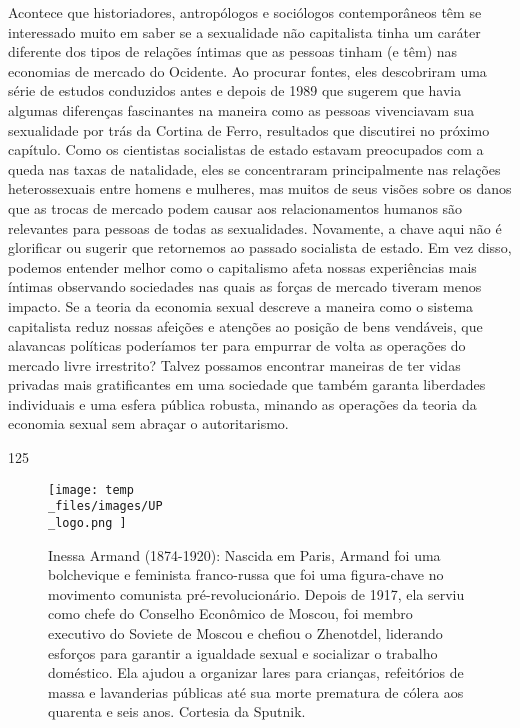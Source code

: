 Acontece que historiadores, antropólogos e sociólogos contemporâneos têm se interessado muito em saber se a sexualidade não capitalista tinha um caráter diferente dos tipos de relações íntimas que as pessoas tinham (e têm) nas economias de mercado do Ocidente. Ao procurar fontes, eles descobriram uma série de estudos conduzidos antes e depois de 1989 que sugerem que havia algumas diferenças fascinantes na maneira como as pessoas vivenciavam sua sexualidade por trás da Cortina de Ferro, resultados que discutirei no próximo capítulo. Como os cientistas socialistas de estado estavam preocupados com a queda nas taxas de natalidade, eles se concentraram principalmente nas relações heterossexuais entre homens e mulheres, mas muitos de seus visões sobre os danos que as trocas de mercado podem causar aos relacionamentos humanos são relevantes para pessoas de todas as sexualidades. Novamente, a chave aqui não é glorificar ou sugerir que retornemos ao passado socialista de estado. Em vez disso, podemos entender melhor como o capitalismo afeta nossas experiências mais íntimas observando sociedades nas quais as forças de mercado tiveram menos impacto. Se a teoria da economia sexual descreve a maneira como o sistema capitalista reduz nossas afeições e atenções ao posição de bens vendáveis, que alavancas políticas poderíamos ter para empurrar de volta as operações do mercado livre irrestrito? Talvez possamos encontrar maneiras de ter vidas privadas mais gratificantes em uma sociedade que também garanta liberdades individuais e uma esfera pública robusta, minando as operações da teoria da economia sexual sem abraçar o autoritarismo.
 \par 
125
 \par 
\begin{figure}
	\centering
	\texttt{[image: temp\\\_files/images/UP\\\_logo.png ]}
	\caption{Inessa Armand (1874-1920): Nascida em Paris, Armand foi uma bolchevique e feminista franco-russa que foi uma figura-chave no movimento comunista pré-revolucionário. Depois de 1917, ela serviu como chefe do Conselho Econômico de Moscou, foi membro executivo do Soviete de Moscou e chefiou o Zhenotdel, liderando esforços para garantir a igualdade sexual e socializar o trabalho doméstico. Ela ajudou a organizar lares para crianças, refeitórios de massa e lavanderias públicas até sua morte prematura de cólera aos quarenta e seis anos. Cortesia da Sputnik.}
	\label{ }
\end{figure}